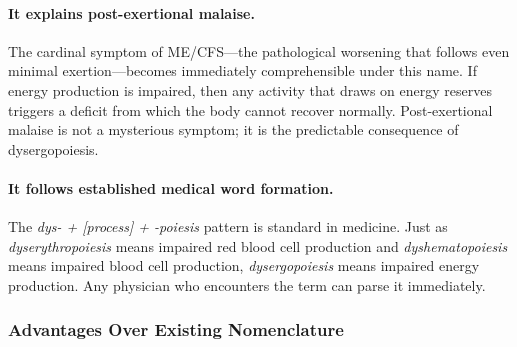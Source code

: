 \paragraph{It explains post-exertional malaise.}
The cardinal symptom of ME/CFS---the pathological worsening that follows even minimal exertion---becomes immediately comprehensible under this name. If energy production is impaired, then any activity that draws on energy reserves triggers a deficit from which the body cannot recover normally. Post-exertional malaise is not a mysterious symptom; it is the predictable consequence of dysergopoiesis.

\paragraph{It follows established medical word formation.}
The \emph{dys- + [process] + -poiesis} pattern is standard in medicine. Just as \emph{dyserythropoiesis} means impaired red blood cell production and \emph{dyshematopoiesis} means impaired blood cell production, \emph{dysergopoiesis} means impaired energy production. Any physician who encounters the term can parse it immediately.

\subsubsection{Advantages Over Existing Nomenclature}

